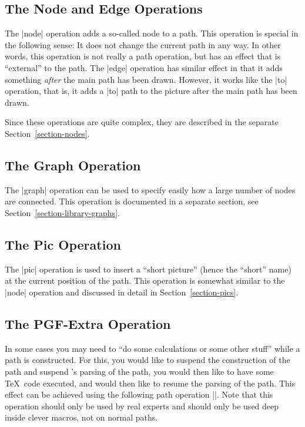 \subsection{The Node and Edge Operations}

The |node| operation adds a so-called node to a
path. This operation is special in the following sense: It does not
change the current path in any way. In other words, this operation
is not really a path operation, but has an effect that is
``external''  to the path. The |edge| operation has similar effect in
that it adds something \emph{after} the main path has been
drawn. However, it works like the |to| operation, that is, it adds a
|to| path to the picture after the main path has been drawn.

Since these operations are quite complex, they are described in the
separate Section~\ref{section-nodes}.


\subsection{The Graph Operation}

The |graph| operation can be used to specify easily how a large number
of nodes are connected. This operation is documented in a separate
section, see Section~\ref{section-library-graphs}.  


\subsection{The Pic Operation}

The |pic| operation is used to insert a ``short picture'' (hence the
``short'' name) at the current position of the path. This operation is
somewhat similar to the |node| operation and discussed in detail in
Section~\ref{section-pics}.


\subsection{The PGF-Extra Operation}

In some cases you may need to ``do some calculations or some other
stuff'' while a path is constructed. For this, you would like to
suspend the construction of the path and suspend \tikzname's parsing
of the path, you would then like to have some \TeX\ code executed, and
would then like to resume the parsing of the path. This effect can be
achieved using the following path operation |\pgfextra|. Note that
this operation should only be used by real experts and should only be
used deep inside clever macros, not on normal paths.

